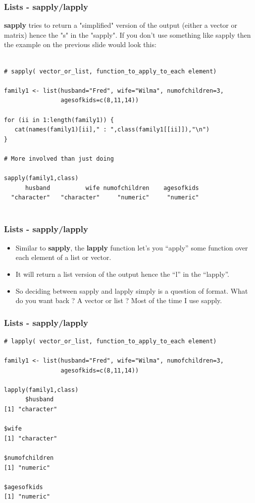 \documentclass{beamer}
\begin{document}
%

%
\begin{frame}[fragile]
\frametitle{Lists - sapply/lapply}
\textbf{sapply} tries to return a "simplified" version of the output (either a vector or matrix) hence the "s" in the "sapply". If you don't use something like sapply then the example on the previous slide would look this:
\footnotesize
\begin{verbatim}

# sapply( vector_or_list, function_to_apply_to_each element)

family1 <- list(husband="Fred", wife="Wilma", numofchildren=3, 
                agesofkids=c(8,11,14))

for (ii in 1:length(family1)) {
   cat(names(family1)[ii]," : ",class(family1[[ii]]),"\n")
}

# More involved than just doing

sapply(family1,class)
      husband          wife numofchildren    agesofkids 
  "character"   "character"     "numeric"     "numeric" 
  
\end{verbatim}
\end{frame}
%

%

\begin{frame}[fragile]
\frametitle{Lists - sapply/lapply}
\begin{itemize}

\item Similar to \textbf{sapply}, the \textbf{lapply} function let's you ``apply'' some function over each element of a list or vector. 

\item It will return a list version of the output hence the ``l'' in the ``lapply''. 

\item So deciding between sapply and lapply simply is a question of format. What do you want back ? A vector or list ? Most of the time I use sapply. 
\end{itemize}
\end{frame}

% 
\begin{frame}[fragile]
\frametitle{Lists - sapply/lapply}
\footnotesize
\begin{verbatim}
# lapply( vector_or_list, function_to_apply_to_each element)

family1 <- list(husband="Fred", wife="Wilma", numofchildren=3, 
                agesofkids=c(8,11,14))

lapply(family1,class)
      $husband
[1] "character"

$wife
[1] "character"

$numofchildren
[1] "numeric"

$agesofkids
[1] "numeric"
\end{verbatim}
\end{frame}
\end{document}

